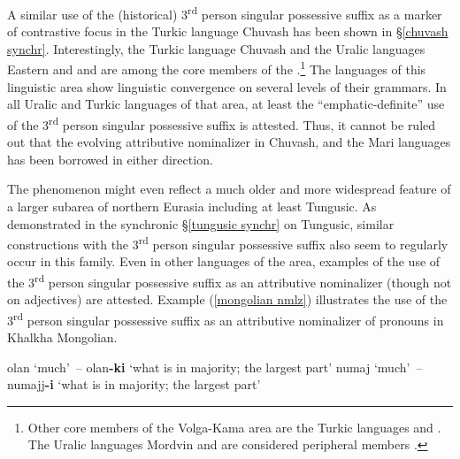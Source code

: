 A similar use of the (historical) 3\textsuperscript{rd} person singular possessive suffix as a marker of contrastive focus in the Turkic language Chuvash has been shown in \S\ref{chuvash synchr}. Interestingly, the Turkic language Chuvash and the Uralic languages Eastern and  and  are among the core members of the .\footnote{Other core members of the Volga-Kama  area are the Turkic languages  and . The Uralic languages Mordvin and  are considered peripheral members \citep{helimski2005}.} The languages of this linguistic area show linguistic convergence on several levels of their grammars. In all Uralic and Turkic languages of that area, at least the “emphatic-definite” use of the 3\textsuperscript{rd} person singular possessive suffix is attested. Thus, it cannot be ruled out that the evolving attributive nominalizer in Chuvash,  and the Mari languages has been borrowed in either direction.%

The phenomenon might even reflect a much older and more widespread feature of a larger subarea of northern Eurasia including at least Tungusic. As demonstrated in the synchronic \S\ref{tungusic synchr} on Tungusic, similar constructions with the 3\textsuperscript{rd} person singular possessive suffix also seem to regularly occur in this family. Even in other languages of the area, examples of the use of the 3\textsuperscript{rd} person singular possessive suffix as an attributive nominalizer (though not on adjectives) are attested. Example (\ref{mongolian nmlz}) illustrates the use of the 3\textsuperscript{rd} person singular possessive suffix as an attributive nominalizer of pronouns in Khalkha Mongolian.
\begin{exe}
\label{mongolian nmlz}
\begin{xlist}
\ex	olan {\upshape ‘much’}~– olan\textbf{-ki} {\upshape ‘what is in majority; the largest part’}
\ex	numaj {\upshape ‘much’}~– numajj\textbf{-i} {\upshape ‘what is in majority; the largest part’}
\end{xlist}
\end{exe}

